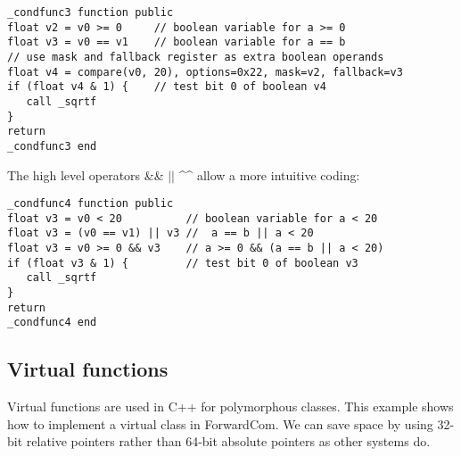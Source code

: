 \documentclass[forwardcom.tex]{subfiles}
\begin{document}
\begin{example}
\label{exampleBooleanOperations3}
\end{example}
\begin{lstlisting}[frame=single]
_condfunc3 function public
float v2 = v0 >= 0     // boolean variable for a >= 0
float v3 = v0 == v1    // boolean variable for a == b
// use mask and fallback register as extra boolean operands
float v4 = compare(v0, 20), options=0x22, mask=v2, fallback=v3
if (float v4 & 1) {    // test bit 0 of boolean v4
   call _sqrtf
}
return
_condfunc3 end
\end{lstlisting}
\vspace{4mm}

The high level operators \&\& $||$ \^{}\^{} allow a more intuitive coding:

\begin{example}
\label{exampleBooleanOperations4}
\end{example}
\begin{lstlisting}[frame=single]
_condfunc4 function public
float v3 = v0 < 20          // boolean variable for a < 20
float v3 = (v0 == v1) || v3 //  a == b || a < 20
float v3 = v0 >= 0 && v3    // a >= 0 && (a == b || a < 20)
if (float v3 & 1) {         // test bit 0 of boolean v3
   call _sqrtf
}
return
_condfunc4 end
\end{lstlisting}
\vspace{4mm}


\subsection{Virtual functions} \label{virtualFunctions}
Virtual functions are used in C++ for polymorphous classes.
This example shows how to implement a virtual class in ForwardCom.
We can save space by using 32-bit relative pointers rather than 64-bit absolute pointers as other systems do.
\vv
\end{document}
